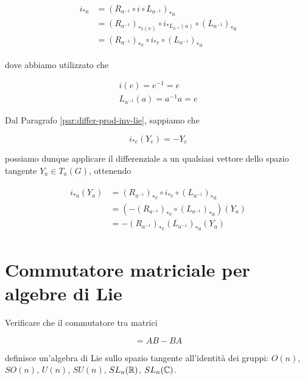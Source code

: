 \begin{align}
	\begin{split}
		i_{*a} &= (R_{a^{-1}} \circ i \circ L_{a^{-1}})_{*a} \\
		&= (R_{a^{-1}})_{*i(e)} \circ i_{*L_{a^{-1}}(a)} \circ (L_{a^{-1}})_{*a} \\
		&= (R_{a^{-1}})_{*e} \circ i_{*e} \circ (L_{a^{-1}})_{*a}
	\end{split}
\end{align}

dove abbiamo utilizzato che

\begin{gather}
	i(e) = e^{-1} = e \\
	L_{a^{-1}}(a) = a^{-1} a = e
\end{gather}

Dal Paragrafo \ref{par:differ-prod-inv-lie}, sappiamo che

\begin{equation}
	i_{*e} (Y_{e}) = - Y_{e}
\end{equation}

possiamo dunque applicare il differenziale a un qualsiasi vettore dello spazio tangente $ Y_{a} \in T_{a}(G) $, ottenendo

\begin{align}
	\begin{split}
		i_{*a}(Y_{a}) &= (R_{a^{-1}})_{*e} \circ i_{*e} \circ (L_{a^{-1}})_{*a} \\
		&= (- (R_{a^{-1}})_{*e} \circ (L_{a^{-1}})_{*a}) (Y_{a}) \\
		&= - (R_{a^{-1}})_{*e} (L_{a^{-1}})_{*a} (Y_{a})
	\end{split}
\end{align}

%

\newpage

%

\section{Commutatore matriciale per algebre di Lie}\label{es3-9}

\begin{tcolorbox}
	Verificare che il commutatore tra matrici
	
	\begin{equation}
		[A,B] = AB - BA
	\end{equation}
	
	definisce un'algebra di Lie sullo spazio tangente all'identità dei gruppi: $ O(n) $, $ SO(n) $, $ U(n) $, $ SU(n) $, $ SL_{n}(\mathbb{R}) $, $ SL_{n}(\mathbb{C}) $.
\end{tcolorbox}

